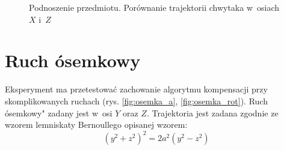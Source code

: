 \begin{figure}[H]
	\centering
	\hfill
	\caption{Podnoszenie przedmiotu. Porównanie trajektorii chwytaka w~osiach $X$ i~$Z$}
	\label{fig:podn_porow_przedm_bok}
\end{figure}





\section{Ruch ósemkowy}
Eksperyment ma przetestować zachowanie algorytmu kompensacji przy skomplikowanych ruchach (rys. \ref{fig:osemka_a}, \ref{fig:osemka_rot}).  Ruch ósemkowy" zadany jest w~osi $Y$ oraz $Z$.
Trajektoria jest zadana zgodnie ze wzorem lemniskaty Bernoullego opisanej wzorem:
\begin{equation}
(y^2 + z^2)^2 = 2a^2(y^2-z^2)
\end{equation}

